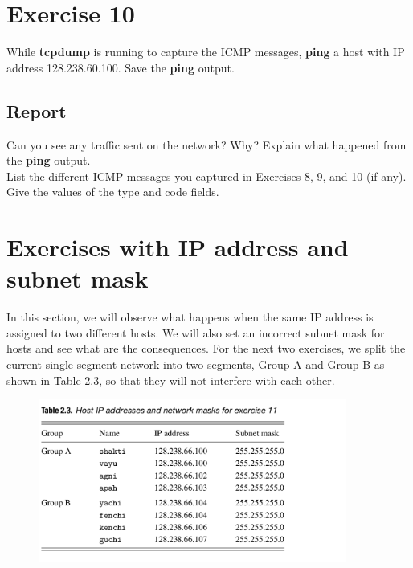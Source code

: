 \documentclass[10pt,a4paper]{article}
\numberwithin{equation}{section}
\numberwithin{figure}{section}
\numberwithin{table}{section}
\begin{document}
    \section{ Exercise 10}
    While \textbf{tcpdump} is running to capture the ICMP messages, \textbf{ping} a host with IP address 128.238.60.100. Save the \textbf{ping} output.
    \subsection*{Report}
    Can you see any traffic sent on the network? Why? Explain what happened from the \textbf{ping} output. \\
    List the different ICMP messages you captured in Exercises 8, 9, and 10 (if any). Give the values of the type and code fields.

    \section*{Exercises with IP address and subnet mask}
    In this section, we will observe what happens when the same IP address is assigned to two different hosts.
    We will also set an incorrect subnet mask for hosts and see what are the consequences.
    For the next two exercises, we split the current single segment network into two segments, Group A and Group B as shown in Table 2.3, so that they will not interfere with each other.
    \begin{figure}[H]
        \centering
        \includegraphics[width=0.9\textwidth]{img/table2-3.png}
    \end{figure}
\end{document}
